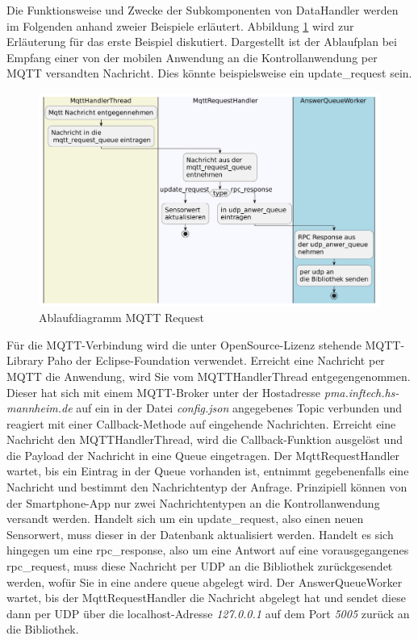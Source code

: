 \documentclass[11pt,a4paper]{report}
\begin{document}
Die Funktionsweise und Zwecke der Subkomponenten von DataHandler werden im Folgenden anhand zweier Beispiele erläutert.
Abbildung \ref{fig:serverMqttReqPath} wird zur Erläuterung für das erste Beispiel diskutiert.
Dargestellt ist der Ablaufplan bei Empfang einer von der mobilen Anwendung an die Kontrollanwendung per MQTT versandten Nachricht.
Dies könnte beispielsweise ein update\_request sein.
\begin{figure}[htbp]
  \centering
  \includegraphics[width=\textwidth]{images/MqttRequestServerPath}
  \caption{Ablaufdiagramm MQTT Request}
  \label{fig:serverMqttReqPath}
\end{figure}

Für die MQTT-Verbindung wird die unter OpenSource-Lizenz stehende MQTT-Library Paho \cite{paho} der Eclipse-Foundation verwendet. 
Erreicht eine Nachricht per MQTT die Anwendung, wird Sie vom MQTTHandlerThread entgegengenommen.
Dieser hat sich mit einem MQTT-Broker unter der Hostadresse \textit{pma.inftech.hs-mannheim.de} auf ein in der Datei \textit{config.json} angegebenes Topic verbunden und reagiert mit einer Callback-Methode auf eingehende Nachrichten.
Erreicht eine Nachricht den MQTTHandlerThread, wird die Callback-Funktion ausgelöst und die Payload der Nachricht in eine Queue eingetragen.
Der MqttRequestHandler wartet, bis ein Eintrag in der Queue vorhanden ist, entnimmt gegebenenfalls eine Nachricht und bestimmt den Nachrichtentyp der Anfrage.
Prinzipiell können von der Smartphone-App nur zwei Nachrichtentypen an die Kontrollanwendung versandt werden.
Handelt sich um ein update\_request, also einen neuen Sensorwert, muss dieser in der Datenbank aktualisiert werden.
Handelt es sich hingegen um eine rpc\_response, also um eine Antwort auf eine vorausgegangenes rpc\_request, muss diese Nachricht per UDP an die Bibliothek zurückgesendet werden, wofür Sie in eine andere queue abgelegt wird.
Der AnswerQueueWorker wartet, bis der MqttRequestHandler die Nachricht abgelegt hat und sendet diese dann per UDP über die localhost-Adresse \textit{127.0.0.1} auf dem Port \textit{5005} zurück an die Bibliothek.
\end{document}
